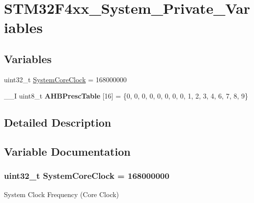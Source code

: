 \hypertarget{group___s_t_m32_f4xx___system___private___variables}{}\section{S\+T\+M32\+F4xx\+\_\+\+System\+\_\+\+Private\+\_\+\+Variables}
\label{group___s_t_m32_f4xx___system___private___variables}
\subsection*{Variables}
\begin{DoxyCompactItemize}
\item 
uint32\+\_\+t \hyperlink{group___s_t_m32_f4xx___system___private___variables_gaa3cd3e43291e81e795d642b79b6088e6}{System\+Core\+Clock} = 168000000
\item 
\hypertarget{group___s_t_m32_f4xx___system___private___variables_gacdc3ef54c0704c90e69a8a84fb2d970d}{}\+\_\+\+\_\+\+I uint8\+\_\+t {\bfseries A\+H\+B\+Presc\+Table} \mbox{[}16\mbox{]} = \{0, 0, 0, 0, 0, 0, 0, 0, 1, 2, 3, 4, 6, 7, 8, 9\}\label{group___s_t_m32_f4xx___system___private___variables_gacdc3ef54c0704c90e69a8a84fb2d970d}

\end{DoxyCompactItemize}


\subsection{Detailed Description}


\subsection{Variable Documentation}
\hypertarget{group___s_t_m32_f4xx___system___private___variables_gaa3cd3e43291e81e795d642b79b6088e6}{}
\subsubsection[{System\+Core\+Clock}]{\setlength{\rightskip}{0pt plus 5cm}uint32\+\_\+t System\+Core\+Clock = 168000000}\label{group___s_t_m32_f4xx___system___private___variables_gaa3cd3e43291e81e795d642b79b6088e6}
System Clock Frequency (Core Clock) 